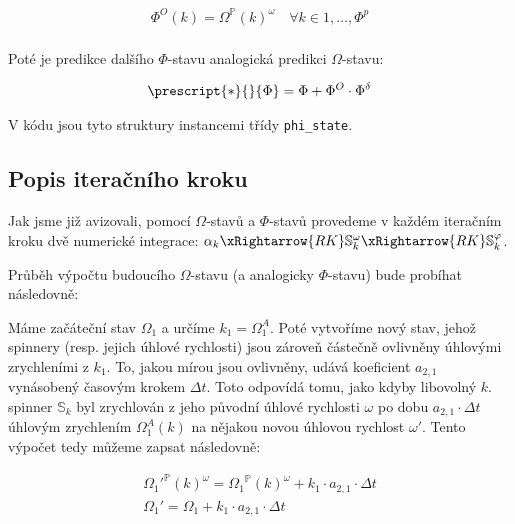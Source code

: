 \begin{equation}
    \label{eq:sim_equations_formalized6}
    \begin{gathered}
        \Phi^O(k) = {\Omega}^{\mathbb{P}}(k)^{\omega}
        \quad
        \forall k \in {1, \ldots, \Phi^{p}} \\
    \end{gathered}
\end{equation}

Poté je predikce dalšího $\Phi$-stavu analogická predikci $\Omega$-stavu:

\begin{equation}
    \label{eq:sim_equations_formalized7}
    \begin{gathered}
        \prescript{*}{}{\Phi} = \Phi + \Phi^O \cdot \Phi^{\delta}
    \end{gathered}
\end{equation}

V kódu jsou tyto struktury instancemi třídy \texttt{phi\_state}.

\subsection{Popis iteračního kroku}

Jak jsme již avizovali, pomocí $\Omega$-stavů a $\Phi$-stavů provedeme v každém iteračním kroku dvě numerické integrace: $\alpha_k \xRightarrow{RK} \mathbb{S}_k^{\omega}  \xRightarrow{RK} \mathbb{S}_k^{\varphi}$.

Průběh výpočtu budoucího $\Omega$-stavu (a analogicky $\Phi$-stavu) bude probíhat následovně:

Máme začáteční stav $\Omega_1$ a určíme $k_1 = \Omega_1^A$.
Poté vytvoříme nový stav, jehož spinnery (resp. jejich úhlové rychlosti) jsou zároveň částečně ovlivněny úhlovými zrychleními z $k_1$.
To, jakou mírou jsou ovlivněny, udává koeficient $a_{2, 1}$ vynásobený časovým krokem $\Delta t$.
Toto odpovídá tomu, jako kdyby libovolný $k$. spinner $\mathbb{S}_k$ byl zrychlován z jeho původní úhlové rychlosti $\omega$ po dobu $a_{2, 1} \cdot \Delta t$ úhlovým zrychlením $\Omega_1^A(k)$ na nějakou novou úhlovou rychlost $\omega'$.
Tento výpočet tedy můžeme zapsat následovně:

\begin{equation}
    \label{eq:sim_equations_formalized8}
    \begin{gathered}
        {\Omega_1'}^{\mathbb{P}} (k) ^{\omega} = {\Omega_1}^{\mathbb{P}} (k) ^{\omega} + k_1 \cdot a_{2, 1} \cdot \Delta t \\
        {\Omega_1'} = {\Omega_1} + k_1 \cdot a_{2, 1} \cdot \Delta t
    \end{gathered}
\end{equation}

